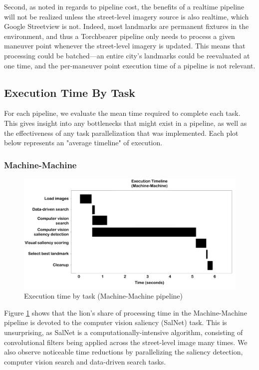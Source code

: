 Second, as noted in regards to pipeline cost, the benefits of a realtime pipeline will not be realized unless the street-level imagery source is also realtime, which Google Streetview is not. Indeed, most landmarks are permanent fixtures in the environment, and thus a Torchbearer pipeline only needs to process a given maneuver point whenever the street-level imagery is updated. This means that processing could be batched---an entire city's landmarks could be reevaluated at one time, and the per-maneuver point execution time of a pipeline is not relevant.

\subsection{Execution Time By Task}

For each pipeline, we evaluate the mean time required to complete each task. This gives insight into any bottlenecks that might exist in a pipeline, as well as the effectiveness of any task parallelization that was implemented. Each plot below represents an "average timeline" of execution.

\subsubsection{Machine-Machine}
\begin{figure}[htbp]
  \centering
  \includegraphics[width=\textwidth]{images/timeline_mm.pdf}
  \caption{Execution time by task (Machine-Machine pipeline)}
  \label{fig:plot:timeline:mm}
\end{figure}

Figure \ref{fig:plot:timeline:mm} shows that the lion's share of processing time in the Machine-Machine pipeline is devoted to the computer vision saliency (SalNet) task. This is unsurprising, as SalNet is a computationally-intensive algorithm, consisting of convolutional filters being applied across the street-level image many times. We also observe noticeable time reductions by parallelizing the saliency detection, computer vision search and data-driven search tasks.

